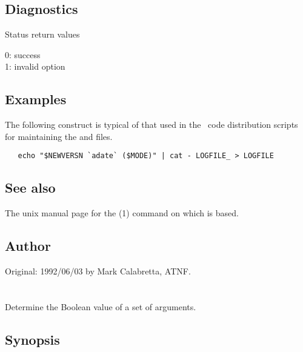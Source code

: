 \subsection*{Diagnostics}

Status return values
\begin{status}
   0: success\\
   1: invalid option
\end{status}

\subsection*{Examples}

The following construct is typical of that used in the \aipspp\ code
distribution scripts for maintaining the  and 
files.

\begin{verbatim}
   echo "$NEWVERSN `adate` ($MODE)" | cat - LOGFILE_ > LOGFILE
\end{verbatim}

\subsection*{See also}

The unix manual page for the (1) command on which  is
based.

\subsection*{Author}

Original: 1992/06/03 by Mark Calabretta, ATNF.


\newpage
\section{}
\label{affirm}



Determine the Boolean value of a set of arguments.

\subsection*{Synopsis}

